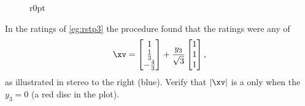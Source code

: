 \begin{wrapfigure}[7]r{0pt}
\end{wrapfigure}
\begin{example} 
In the  ratings of \cref{eg:rstp3} the procedure found that the ratings were any of
\begin{equation*}
\xv=\begin{bmatrix} 1\\\frac13\\-\frac43 \end{bmatrix}
+\frac{y_3}{\sqrt3}\begin{bmatrix} 1\\1\\1 \end{bmatrix},
\end{equation*}
as illustrated in stereo to the right (blue).
Verify that \(|\xv|\) is a  only when the  \(y_3=0\) (a red disc in the plot).


\end{example}
